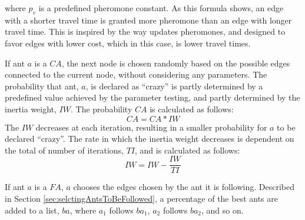 where $p_v$ is a predefined pheromone constant. As this formula shows, an edge with a shorter travel time is granted more pheromone than an edge with longer travel time. This is inspired by the way \citet{hsiao04} updates pheromones, and designed to favor edges with lower cost, which in this case, is lower travel times. 

If ant $a$ is a $CA$, the next node is chosen randomly based on the possible edges connected to the current node, without considering any parameters. The probability that ant, $a$, is declared as ``crazy'' is partly determined by a predefined value achieved by the parameter testing, and partly determined by the inertia weight, $IW$. The probability $CA$ is calculated as follows:
$$CA = CA*IW$$
The $IW$ decreases at each iteration, resulting in a smaller probability for $a$ to be declared ``crazy''. The rate in which the inertia weight decreases is dependent on the total of number of iterations, $TI$, and is calculated as follows:
$$IW = IW - \frac{IW}{TI}$$

If ant $a$ is a $FA$, $a$ chooses the edges chosen by the ant it is following. Described in Section \vref{sec:selctingAntsToBeFollowed}, a percentage of the best ants are added to a list, $ba$, where $a_1$ follows $ba_1$, $a_2$ follows $ba_2$, and so on. %